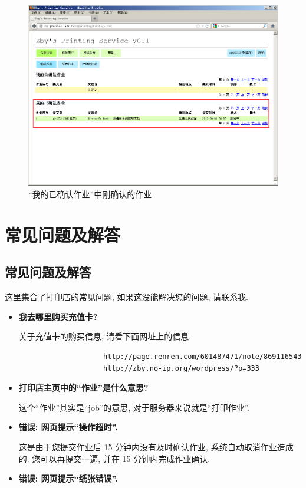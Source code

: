 \documentclass{article}
\begin{document}
\begin{CJK}{UTF8}{gbsn}
\begin{figure}[hp]
				\includegraphics[height=0.45\textheight]{jobconfirm3.png}
				\caption{``我的已确认作业''中刚确认的作业}
				\label{fig:jobconfirm3}
			\end{figure}
			\clearpage

\newpage
\section{常见问题及解答}
	\subsection{常见问题及解答}
		\label{sec:faq}
		这里集合了打印店的常见问题, 如果这没能解决您的问题, 请联系我.
		\begin{itemize}
			\item{\textbf{我去哪里购买充值卡?}
			
				关于充值卡的购买信息, 请看下面网址上的信息.
				\begin{verbatim}
					http://page.renren.com/601487471/note/869116543
					http://zby.no-ip.org/wordpress/?p=333
				\end{verbatim}
			}
			\item{\textbf{打印店主页中的``作业''是什么意思?}
			
				这个``作业''其实是``job''的意思, 对于服务器来说就是``打印作业''.
			}
			\item{\textbf{错误: 网页提示``操作超时''.}
				
				这是由于您提交作业后 15 分钟内没有及时确认作业, 系统自动取消作业造成的. 您可以再提交一遍, 并在 15 分钟内完成作业确认.
			}
			\item{\textbf{错误: 网页提示``纸张错误''.}
			
}
\end{itemize}
\end{CJK}
\end{document}
